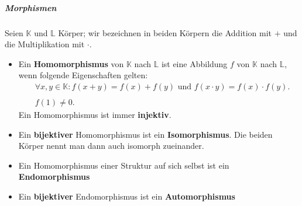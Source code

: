 \documentclass[12pt]{article}
\begin{document}
\vspace{1cm}
\subparagraph{\large Morphismen}
\normalsize
\begin{flushleft}
    Seien $\mathbb{K}$ und $\mathbb{L}$ Körper; wir bezeichnen in beiden Körpern die Addition mit $+$ und die Multiplikation mit $\cdot$.
    \begin{itemize}
        \item Ein \textbf{Homomorphismus} von $\mathbb{K}$ nach $\mathbb{L}$ ist eine Abbildung $f$ von $\mathbb{K}$ nach $\mathbb{L}$, wenn folgende Eigenschaften gelten:
        \begin{align*}
            &\forall x,y \in \mathbb{K}: f(x + y) = f(x) + f(y) \text{ und } f(x\cdot y) = f(x) \cdot f(y). \\
            &\\
            &f(1) \not = 0.
        \end{align*}
        Ein Homomorphismus ist immer \textbf{injektiv}.
        \item Ein \textbf{bijektiver} Homomorphismus ist ein \textbf{Isomorphismus}. Die beiden Körper nennt man dann auch isomorph zueinander.
        \item Ein Homomorphismus einer Struktur auf sich selbst ist ein \textbf{Endomorphismus}
        \item Ein \textbf{bijektiver} Endomorphismus ist ein \textbf{Automorphismus}
    \end{itemize}
\end{flushleft}
\end{document}

